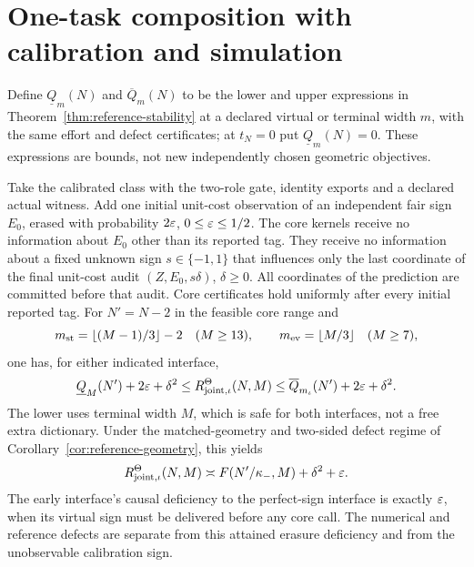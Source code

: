 \section{One-task composition with calibration and simulation}
\label{sec:calibrated-composition}
Define $\underline Q_m(N)$ and $\overline Q_m(N)$ to be the lower and upper expressions in Theorem~\ref{thm:reference-stability} at a declared virtual or terminal width $m$, with the same effort and defect certificates; at $t_N=0$ put $\underline Q_m(N)=0$. These expressions are bounds, not new independently chosen geometric objectives.

\begin{corollary}\label{cor:calibrated-joint}
Take the calibrated class with the two-role gate, identity exports and a declared actual witness. Add one initial unit-cost observation of an independent fair sign $E_0$, erased with probability $2\varepsilon$, $0\le\varepsilon\le1/2$. The core kernels receive no information about $E_0$ other than its reported tag. They receive no information about a fixed unknown sign $s\in\{-1,1\}$ that influences only the last coordinate of the final unit-cost audit
$(Z,E_0,s\delta)$, $\delta\ge0$. All coordinates of the prediction are committed before that audit. Core certificates hold uniformly after every initial reported tag. For $N'=N-2$ in the feasible core range and
\[
 m_{\mathrm{st}}=\lfloor(M-1)/3\rfloor-2\quad(M\ge13),\qquad
 m_{\mathrm{ev}}=\lfloor M/3\rfloor\quad(M\ge7),
\]
one has, for either indicated interface,
\begin{equation}\label{eq:calibrated-joint}
 \underline Q_M(N')+2\varepsilon+\delta^2
 \le R_{{\rm joint},\iota}^\Theta(N,M)
 \le \overline Q_{m_\iota}(N')+2\varepsilon+\delta^2.
\end{equation}
The lower uses terminal width $M$, which is safe for both interfaces, not a free extra dictionary. Under the matched-geometry and two-sided defect regime of Corollary~\ref{cor:reference-geometry}, this yields
\[
 R_{{\rm joint},\iota}^\Theta(N,M)
 \asymp F(N'/\kappa_-,M)+\delta^2+\varepsilon.
\]
The early interface's causal deficiency to the perfect-sign interface is exactly $\varepsilon$, when its virtual sign must be delivered before any core call. The numerical and reference defects are separate from this attained erasure deficiency and from the unobservable calibration sign.
\end{corollary}
